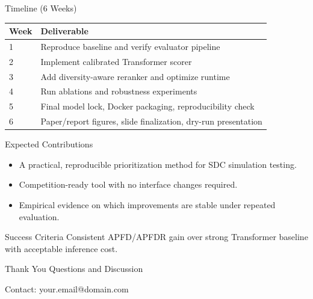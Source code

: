 ﻿\documentclass[10pt,aspectratio=169]{beamer}
\begin{document}
\begin{frame}{Timeline (6 Weeks)}
\small
\begin{table}
\centering
\begin{tabular}{ll}
\toprule
Week & Deliverable \\
\midrule
1 & Reproduce baseline and verify evaluator pipeline \\
2 & Implement calibrated Transformer scorer \\
3 & Add diversity-aware reranker and optimize runtime \\
4 & Run ablations and robustness experiments \\
5 & Final model lock, Docker packaging, reproducibility check \\
6 & Paper/report figures, slide finalization, dry-run presentation \\
\bottomrule
\end{tabular}
\end{table}
\end{frame}

\begin{frame}{Expected Contributions}
\begin{itemize}
  \item A practical, reproducible prioritization method for SDC simulation testing.
  \item Competition-ready tool with no interface changes required.
  \item Empirical evidence on which improvements are stable under repeated evaluation.
\end{itemize}
\vspace{0.4cm}
\begin{block}{Success Criteria}
Consistent APFD/APFDR gain over strong Transformer baseline with acceptable inference cost.
\end{block}
\end{frame}

\begin{frame}{Thank You}
\centering
\Large Questions and Discussion
\vspace{0.6cm}

\normalsize
Contact: your.email@domain.com
\end{frame}
\end{document}
